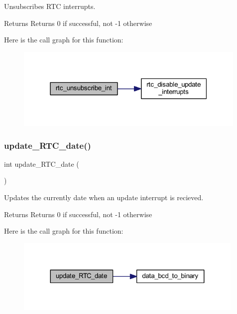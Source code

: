 Unsubscribes R\+TC interrupts. 

\begin{DoxyReturn}{Returns}
Returns 0 if successful, not -\/1 otherwise 
\end{DoxyReturn}
Here is the call graph for this function\+:
\nopagebreak
\begin{figure}[H]
\begin{center}
\leavevmode
\includegraphics[width=315pt]{group__rtc_gab8f17bf5280c908c8b199a90fefcc758_cgraph}
\end{center}
\end{figure}
\mbox{\label{group__rtc_gac55b23b9b681e0bd120a88e35580825a}} 
\subsubsection{\texorpdfstring{update\_RTC\_date()}{update\_RTC\_date()}}
{\footnotesize\ttfamily int update\+\_\+\+R\+T\+C\+\_\+date (\begin{DoxyParamCaption}{ }\end{DoxyParamCaption})}



Updates the currently date when an update interrupt is recieved. 

\begin{DoxyReturn}{Returns}
Returns 0 if successful, not -\/1 otherwise 
\end{DoxyReturn}
Here is the call graph for this function\+:
\nopagebreak
\begin{figure}[H]
\begin{center}
\leavevmode
\includegraphics[width=311pt]{group__rtc_gac55b23b9b681e0bd120a88e35580825a_cgraph}
\end{center}
\end{figure}
